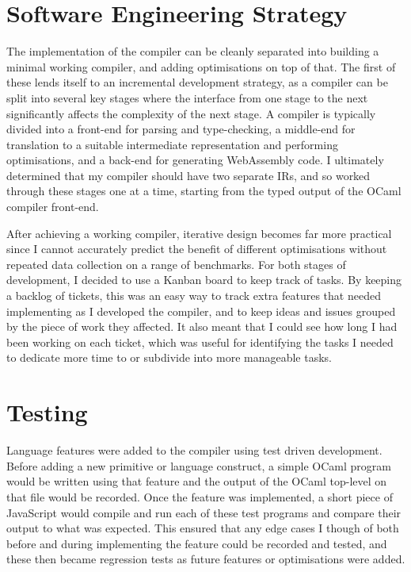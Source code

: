 \section{Software Engineering Strategy}
The implementation of the compiler can be cleanly separated into building a minimal working compiler, and adding optimisations on top of that. The first of these lends itself to an incremental development strategy, as a compiler can be split into several key stages where the interface from one stage to the next significantly affects the complexity of the next stage. A compiler is typically divided into a front-end for parsing and type-checking, a middle-end for translation to a suitable intermediate representation and performing optimisations, and a back-end for generating WebAssembly code. I ultimately determined that my compiler should have two separate IRs, and so worked through these stages one at a time, starting from the typed output of the OCaml compiler front-end. 

After achieving a working compiler, iterative design becomes far more practical since I cannot accurately predict the benefit of different optimisations without repeated data collection on a range of benchmarks. For both stages of development, I decided to use a Kanban board to keep track of tasks. %
By keeping a backlog of tickets, this was an easy way to track extra features that needed implementing as I developed the compiler, and to keep ideas and issues grouped by the piece of work they affected. It also meant that I could see how long I had been working on each ticket, which was useful for identifying the tasks I needed to dedicate more time to or subdivide into more manageable tasks.

\section{Testing}
Language features were added to the compiler using test driven development. Before adding a new primitive or language construct, a simple OCaml program would be written using that feature and the output of the OCaml top-level on that file would be recorded. Once the feature was implemented, a short piece of JavaScript would compile and run each of these test programs and compare their output to what was expected. This ensured that any edge cases I though of both before and during implementing the feature could be recorded and tested, and these then became regression tests as future features or optimisations were added.

